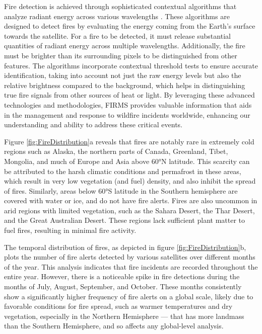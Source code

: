 \documentclass[
  12 pt,
]{Nemilov}
\begin{document}
Fire detection is achieved through sophisticated contextual algorithms that analyze radiant energy across various wavelengths \citep{davies2008fire}. These algorithms are designed to detect fires by evaluating the energy coming from the Earth's surface towards the satellite. For a fire to be detected, it must release substantial quantities of radiant energy across multiple wavelengths. Additionally, the fire must be brighter than its surrounding pixels to be distinguished from other features. The algorithms incorporate contextual threshold tests to ensure accurate identification, taking into account not just the raw energy levels but also the relative brightness compared to the background, which helps in distinguishing true fire signals from other sources of heat or light. By leveraging these advanced technologies and methodologies, FIRMS provides valuable information that aids in the management and response to wildfire incidents worldwide, enhancing our understanding and ability to address these critical events.

Figure \ref{fig:FireDistribution}a reveals that fires are notably rare in extremely cold regions such as Alaska, the northern parts of Canada, Greenland, Tibet, Mongolia, and much of Europe and Asia above 60°N latitude. This scarcity can be attributed to the harsh climatic conditions and permafrost in these areas, which result in very low vegetation (and fuel) density, and also inhibit the spread of fires. Similarly, areas below 60°S latitude in the Southern hemisphere are covered with water or ice, and do not have fire alerts. Fires are also uncommon in arid regions with limited vegetation, such as the Sahara Desert, the Thar Desert, and the Great Australian Desert. These regions lack sufficient plant matter to fuel fires, resulting in minimal fire activity.

The temporal distribution of fires, as depicted in figure \ref{fig:FireDistribution}b, plots the number of fire alerts detected by various satellites over different months of the year. This analysis indicates that fire incidents are recorded throughout the entire year. However, there is a noticeable spike in fire detections during the months of July, August, September, and October. These months consistently show a significantly higher frequency of fire alerts on a global scale, likely due to favorable conditions for fire spread, such as warmer temperatures and dry vegetation, especially in the Northern Hemisphere --- that has more landmass than the Southern Hemisphere, and so affects any global-level analysis.
\end{document}
